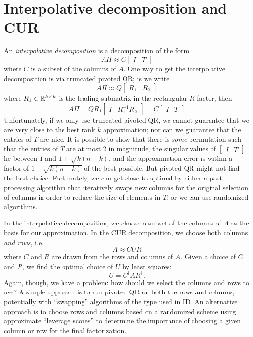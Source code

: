\documentclass[12pt, leqno]{article} %
\begin{document}
\section{Interpolative decomposition and CUR}

An {\em interpolative decomposition} is a decomposition of the form
\[
  A \Pi \approx C \begin{bmatrix} I & T \end{bmatrix}
\]
where $C$ is a subset of the columns of $A$.  One way to get the
interpolative decomposition is via truncated pivoted QR; is we write
\[
  A \Pi \approx
  Q \begin{bmatrix} R_1 & R_2 \end{bmatrix}
\]
where $R_1 \in \mathbb{R}^{k \times k}$ is the leading submatrix in the
rectangular $R$ factor, then
\[
  A \Pi =
  Q R_1 \begin{bmatrix} I & R_1^{-1} R_2 \end{bmatrix} =
  C \begin{bmatrix} I & T \end{bmatrix}
\]
Unfortunately, if we only use truncated pivoted QR, we cannot
guarantee that we are very close to the best rank $k$ approximation;
nor can we guarantee that the entries of $T$ are nice.  It is possible
to show that there is {\em some} permutation such that the entries
of $T$ are at most 2 in magnitude,
the singular values of $\begin{bmatrix} I & T \end{bmatrix}$
lie between $1$ and $1+\sqrt{k(n-k)}$, and the approximation
error is within a factor of $1+\sqrt{k(n-k)}$ of the best possible.
But pivoted QR might not find the best choice.  Fortunately, we can
get close to optimal by either a post-processing algorithm that
iteratively swaps new columns for the original selection of columns in
order to reduce the size of elements in $T$; or we can use randomized
algorithms.

In the interpolative decomposition, we choose a subset of the columns
of $A$ as the basis for our approximation.  In the CUR decomposition,
we choose both columns {\em and rows}, i.e.
\[
  A \approx C U R
\]
where $C$ and $R$ are drawn from the rows and columns of $A$.
Given a choice of $C$ and $R$, we find the optimal choice of $U$
by least squares:
\[
  U = C^\dagger A R^\dagger.
\]
Again, though, we have a problem: how should we select the columns and
rows to use?  A simple approach is to run pivoted QR on both the rows
and columns, potentially with ``swapping'' algorithms of the type used
in ID.  An alternative approach is to choose rows and columns based on
a randomized scheme using approximate ``leverage scores'' to determine
the importance of choosing a given column or row for the final
factorization.
\end{document}
